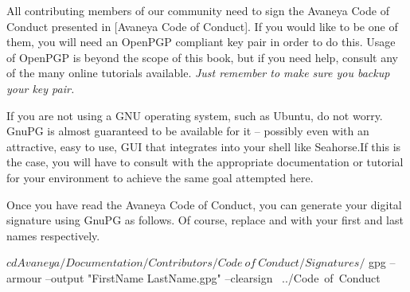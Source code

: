 

All contributing members of our community need to sign the Avaneya Code of Conduct presented in [Avaneya Code of Conduct]. If you would like to be one of them, you will need an OpenPGP compliant key pair in order to do this. Usage of OpenPGP is beyond the scope of this book, but if you need help, consult any of the many online tutorials available. {\it Just remember to make sure you backup your key pair.}

If you are not using a GNU operating system, such as Ubuntu, do not worry. GnuPG is almost guaranteed to be available for it -- possibly even with an attractive, easy to use, GUI that integrates into your shell like Seahorse.\footnotecite[seahorse] If this is the case, you will have to consult with the appropriate documentation or tutorial for your environment to achieve the same goal attempted here.

Once you have read the Avaneya Code of Conduct, you can generate your digital signature using GnuPG as follows. Of course, replace  and  with your first and last names respectively.

\startCodeExample
$ cd Avaneya/Documentation/Contributors/Code\ of\ Conduct/Signatures/
$ gpg --armour --output "FirstName LastName.gpg" --clearsign \
    ../Code\ of\ Conduct
\stopCodeExample

